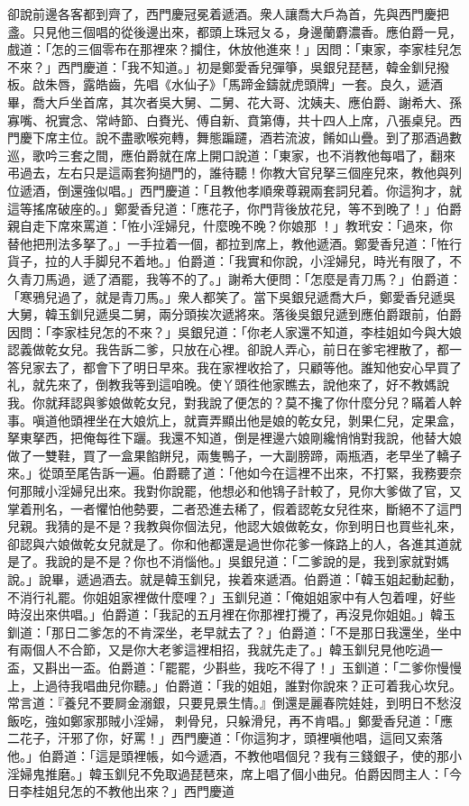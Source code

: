 卻說前邊各客都到齊了，西門慶冠冕着遞酒。衆人讓喬大戶為首，先與西門慶把盞。只見他三個唱的從後邊出來，都頭上珠冠ㄆる，身邊蘭麝濃香。應伯爵一見，戲道：「怎的三個零布在那裡來？攔住，休放他進來！」因問：「東家，李家桂兒怎不來？」西門慶道：「我不知道。」初是鄭愛香兒彈箏，吳銀兒琵琶，韓金釧兒撥板。啟朱唇，露皓齒，先唱《水仙子》「馬蹄金鑄就虎頭牌」一套。{}良久，遞酒畢，喬大戶坐首席，其次者吳大舅、二舅、花大哥、沈姨夫、應伯爵、謝希大、孫寡嘴、祝實念、常峙節、白賚光、傅自新、賁第傳，共十四人上席，八張桌兒。西門慶下席主位。說不盡歌喉宛轉，舞態蹁躚，酒若流波，餚如山疊。到了那酒過數巡，歌吟三套之間，應伯爵就在席上開口說道：「東家，也不消教他每唱了，翻來弔過去，左右只是這兩套狗撾門的，誰待聽！你教大官兒拏三個座兒來，教他與列位遞酒，倒還強似唱。」西門慶道：「且教他孝順衆尊親兩套詞兒着。你這狗才，就這等搖席破座的。」鄭愛香兒道：「應花子，你門背後放花兒，等不到晚了！」伯爵親自走下席來罵道：「恠小淫婦兒，什麼晚不晚？你娘那𣭈！」教玳安：「過來，你替他把刑法多拏了。」一手拉着一個，都拉到席上，教他遞酒。鄭愛香兒道：「恠行貨子，拉的人手脚兒不着地。」伯爵道：「我實和你說，小淫婦兒，時光有限了，不久青刀馬過，遞了酒罷，我等不的了。」謝希大便問：「怎麼是青刀馬？」伯爵道：「寒鴉兒過了，就是青刀馬。」衆人都笑了。當下吳銀兒遞喬大戶，鄭愛香兒遞吳大舅，韓玉釧兒遞吳二舅，兩分頭挨次遞將來。落後吳銀兒遞到應伯爵跟前，伯爵因問：「李家桂兒怎的不來？」吳銀兒道：「你老人家還不知道，李桂姐如今與大娘認義做乾女兒。我告訴二爹，只放在心裡。卻說人弄心，前日在爹宅裡散了，都一答兒家去了，都會下了明日早來。我在家裡收拾了，只顧等他。誰知他安心早買了礼，就先來了，倒教我等到這咱晚。使丫頭徃他家瞧去，說他來了，好不教媽說我。你就拜認與爹娘做乾女兒，對我說了便怎的？莫不攙了你什麼分兒？瞞着人幹事。嗔道他頭裡坐在大娘炕上，就賣弄顯出他是娘的乾女兒，剝果仁兒，定果盒，拏東拏西，把俺每徃下躧。我還不知道，倒是裡邊六娘剛纔悄悄對我說，他替大娘做了一雙鞋，買了一盒果餡餅兒，兩隻鴨子，一大副膀蹄，兩瓶酒，老早坐了轎子來。」從頭至尾告訴一遍。伯爵聽了道：「他如今在這裡不出來，不打緊，我務要奈何那賊小淫婦兒出來。我對你說罷，他想必和他鴇子計較了，見你大爹做了官，又掌着刑名，一者懼怕他勢要，二者恐進去稀了，假着認乾女兒徃來，斷絕不了這門兒親。我猜的是不是？我教與你個法兒，他認大娘做乾女，你到明日也買些礼來，卻認與六娘做乾女兒就是了。你和他都還是過世你花爹一條路上的人，各進其道就是了。我說的是不是？你也不消惱他。」吳銀兒道：「二爹說的是，我到家就對媽說。」說畢，遞過酒去。就是韓玉釧兒，挨着來遞酒。伯爵道：「韓玉姐起動起動，不消行礼罷。你姐姐家裡做什麼哩？」玉釧兒道：「俺姐姐家中有人包着哩，好些時沒出來供唱。」伯爵道：「我記的五月裡在你那裡打攪了，再沒見你姐姐。」韓玉釧道：「那日二爹怎的不肯深坐，老早就去了？」伯爵道：「不是那日我還坐，坐中有兩個人不合節，又是你大老爹這裡相招，我就先走了。」韓玉釧兒見他吃過一盃，又斟出一盃。伯爵道：「罷罷，少斟些，我吃不得了！」玉釧道：「二爹你慢慢上，上過待我唱曲兒你聽。」伯爵道：「我的姐姐，誰對你說來？正可着我心坎兒。常言道：『養兒不要屙金溺銀，只要見景生情。』倒還是麗春院娃娃，到明日不愁沒飯吃，強如鄭家那賊小淫婦，𢱉剌骨兒，只躲滑兒，再不肯唱。」鄭愛香兒道：「應二花子，汗邪了你，好罵！」西門慶道：「你這狗才，頭裡嗔他唱，這囘又索落他。」伯爵道：「這是頭裡帳，如今遞酒，不教他唱個兒？我有三錢銀子，使的那小淫婦鬼推磨。」韓玉釧兒不免取過琵琶來，席上唱了個小曲兒。伯爵因問主人：「今日李桂姐兒怎的不教他出來？」西門慶道